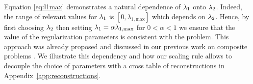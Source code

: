 \documentclass[12pt]{article}
\begin{document}



    Equation \eqref{eq:l1max} demonstrates a natural dependence of $\lambda_{1}$ onto $\lambda_{2}$. Indeed, the range of relevant values for $\lambda_{1}$ is $[0, \lambda_{1, \mathrm{max}}]$ which depends on $\lambda_{2}$. Hence, by first choosing $\lambda_{2}$ then setting $\lambda_{1} = \alpha \lambda_{1, \mathrm{max}}$ for $0 < \alpha < 1$ we ensure that the value of the regularization parameters is consistent with the problem. This approach was already proposed and discussed in our previous work on composite problems \cite{jarret2024decoupled}. We illustrate this dependency and how our scaling rule allows to decouple the choice of parameters with a cross table of reconstructions in Appendix~\ref{app:reconstructions}.
\end{document}
